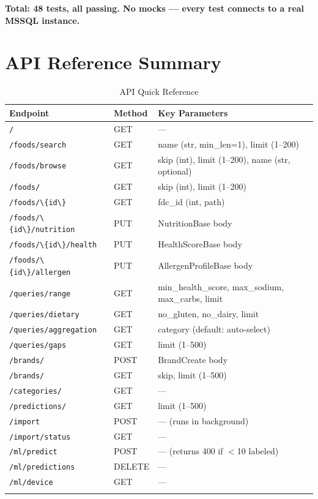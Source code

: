 \documentclass[12pt,a4paper]{article}
\begin{document}
\textbf{Total: 48 tests, all passing. No mocks — every test connects to a real MSSQL instance.}

\section{API Reference Summary}

\begin{longtable}{p{5.5cm}p{2cm}p{7.5cm}}
\toprule
\textbf{Endpoint} & \textbf{Method} & \textbf{Key Parameters} \\
\midrule
\lstinline|/| & GET & — \\
\lstinline|/foods/search| & GET & name (str, min\_len=1), limit (1–200) \\
\lstinline|/foods/browse| & GET & skip (int), limit (1–200), name (str, optional) \\
\lstinline|/foods/| & GET & skip (int), limit (1–200) \\
\lstinline|/foods/\{id\}| & GET & fdc\_id (int, path) \\
\lstinline|/foods/\{id\}/nutrition| & PUT & NutritionBase body \\
\lstinline|/foods/\{id\}/health| & PUT & HealthScoreBase body \\
\lstinline|/foods/\{id\}/allergen| & PUT & AllergenProfileBase body \\
\lstinline|/queries/range| & GET & min\_health\_score, max\_sodium, max\_carbs, limit \\
\lstinline|/queries/dietary| & GET & no\_gluten, no\_dairy, limit \\
\lstinline|/queries/aggregation| & GET & category (default: auto-select) \\
\lstinline|/queries/gaps| & GET & limit (1–500) \\
\lstinline|/brands/| & POST & BrandCreate body \\
\lstinline|/brands/| & GET & skip, limit (1–500) \\
\lstinline|/categories/| & GET & — \\
\lstinline|/predictions/| & GET & limit (1–500) \\
\lstinline|/import| & POST & — (runs in background) \\
\lstinline|/import/status| & GET & — \\
\lstinline|/ml/predict| & POST & — (returns 400 if $<$10 labeled) \\
\lstinline|/ml/predictions| & DELETE & — \\
\lstinline|/ml/device| & GET & — \\
\bottomrule
\caption{API Quick Reference}
\end{longtable}
\end{document}
